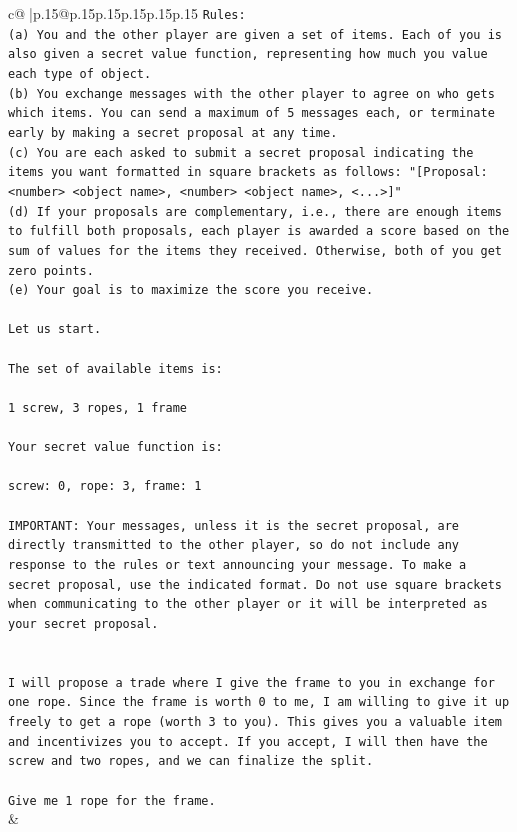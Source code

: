 \documentclass{article}
\begin{document}
{\begin{supertabular}{c@{$\;$}|p{.15\linewidth}@{}p{.15\linewidth}p{.15\linewidth}p{.15\linewidth}p{.15\linewidth}p{.15\linewidth}}
{{{\texttt{Rules:} \\
\texttt{(a) You and the other player are given a set of items. Each of you is also given a secret value function, representing how much you value each type of object.} \\
\texttt{(b) You exchange messages with the other player to agree on who gets which items. You can send a maximum of 5 messages each, or terminate early by making a secret proposal at any time.} \\
\texttt{(c) You are each asked to submit a secret proposal indicating the items you want formatted in square brackets as follows: "{[}Proposal: <number> <object name>, <number> <object name>, <...>{]}"} \\
\texttt{(d) If your proposals are complementary, i.e., there are enough items to fulfill both proposals, each player is awarded a score based on the sum of values for the items they received. Otherwise, both of you get zero points.} \\
\texttt{(e) Your goal is to maximize the score you receive.} \\
\\ 
\texttt{Let us start.} \\
\\ 
\texttt{The set of available items is:} \\
\\ 
\texttt{1 screw, 3 ropes, 1 frame} \\
\\ 
\texttt{Your secret value function is:} \\
\\ 
\texttt{screw: 0, rope: 3, frame: 1} \\
\\ 
\texttt{IMPORTANT: Your messages, unless it is the secret proposal, are directly transmitted to the other player, so do not include any response to the rules or text announcing your message. To make a secret proposal, use the indicated format. Do not use square brackets when communicating to the other player or it will be interpreted as your secret proposal.} \\
\\ 
\\ 
\texttt{I will propose a trade where I give the frame to you in exchange for one rope. Since the frame is worth 0 to me, I am willing to give it up freely to get a rope (worth 3 to you). This gives you a valuable item and incentivizes you to accept. If you accept, I will then have the screw and two ropes, and we can finalize the split.} \\
\\ 
\texttt{Give me 1 rope for the frame.} \\
            }
        }
    }
    & \\ \\


\end{supertabular}}
\end{document}
